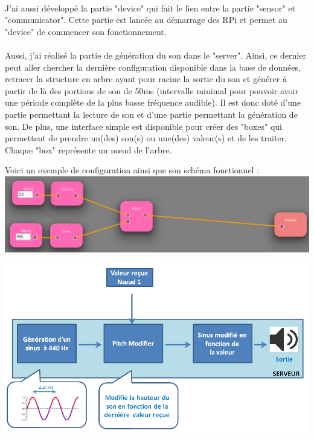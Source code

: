 \documentclass[12pt]{article}
\begin{document}
	\paragraph{}
	J'ai aussi développé la partie "device" qui fait le lien entre la partie "sensor" et "communicator". Cette partie est lancée au démarrage des RPi et permet au "device" de commencer son fonctionnement.
	
	\paragraph{}
	Aussi, j'ai réalisé la partie de génération du son dans le "server". Ainsi, ce dernier peut aller chercher la dernière configuration disponible dans la base de données, retracer la structure en arbre ayant pour racine la sortie du son et générer à partir de là des portions de son de 50ms (intervalle minimal pour pouvoir avoir une période complète de la plus basse fréquence audible). Il est donc doté d'une partie permettant la lecture de son et d'une partie permettant la génération de son. De plus, une interface simple est disponible pour créer des "boxes" qui permettent de prendre un(des) son(s) ou une(des) valeur(s) et de les traiter. Chaque "box" représente un nœud de l'arbre.
	
	Voici un exemple de configuration ainsi que son schéma fonctionnel :\\
	
	\noindent
	\includegraphics[width=\textwidth]{config_sheme}
	
	\noindent
	\includegraphics[width=\textwidth]{config_example}
	
\end{document}
